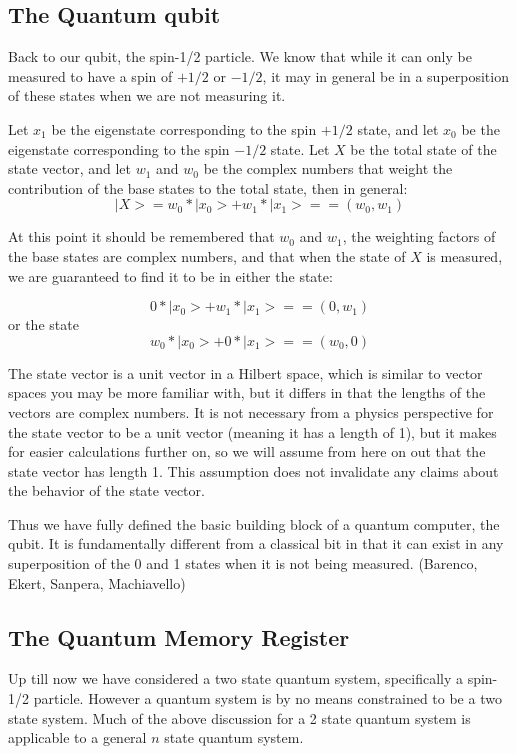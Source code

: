 \documentclass[]{article}
\begin{document}
\subsection{The Quantum qubit}

Back to our qubit, the spin-1/2 particle. We know that while it can
only be measured to have a spin of $+1/2$ or $-1/2$, it may in general
be in a superposition of these states when we are not measuring it.

Let $x_{1}$ be the eigenstate corresponding to the spin $+1/2$ state,
and let $x_{0}$ be the eigenstate corresponding to the spin $-1/2$
state.  Let $X$ be the total state of the state vector, and let
$w_{1}$ and $w_{0}$ be the complex numbers that weight the
contribution of the base states to the total state, then in general:
\[|X> = w_{0} * |x_{0}> + w_{1} * |x_{1}> == (w_{0},w_{1})\]

At this point it should be remembered that $w_{0}$ and $w_{1}$, the
weighting factors of the base states are complex numbers, and that
when the state of $X$ is measured, we are guaranteed to find it to be
in either the state:

	\[0 * |x_{0}> + w_{1} * |x_{1}> == (0,w_{1})\] or the state
	\[w_{0} * |x_{0}> + 0 * |x_{1}> == (w_{0},0)\]

The state vector is a unit vector in a Hilbert space, which is similar
to vector spaces you may be more familiar with, but it differs in that
the lengths of the vectors are complex numbers. It is not necessary
from a physics perspective for the state vector to be a unit vector
(meaning it has a length of 1), but it makes for easier calculations
further on, so we will assume from here on out that the state vector
has length 1. This assumption does not invalidate any claims about
the behavior of the state vector. 

Thus we have fully defined the basic building block of a quantum
computer, the qubit. It is fundamentally different from a classical
bit in that it can exist in any superposition of the 0 and 1 states
when it is not being measured. (Barenco, Ekert, Sanpera, Machiavello)

\subsection{The Quantum Memory Register}

Up till now we have considered a two state quantum system,
specifically a spin-1/2 particle. However a quantum system is by no
means constrained to be a two state system. Much of the above
discussion for a 2 state quantum system is applicable to a general $n$
state quantum system.
\end{document}
